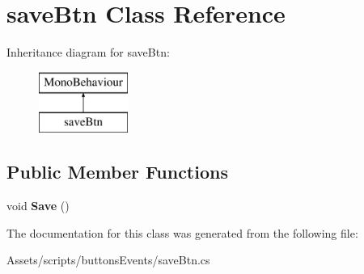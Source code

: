 \hypertarget{classsave_btn}{}\section{save\+Btn Class Reference}
\label{classsave_btn}
Inheritance diagram for save\+Btn\+:\begin{figure}[H]
\begin{center}
\leavevmode
\includegraphics[height=2.000000cm]{classsave_btn}
\end{center}
\end{figure}
\subsection*{Public Member Functions}
\begin{DoxyCompactItemize}
\item 
\mbox{\label{classsave_btn_a0e4102d46dfe26be5bc4d74726365989}} 
void {\bfseries Save} ()
\end{DoxyCompactItemize}


The documentation for this class was generated from the following file\+:\begin{DoxyCompactItemize}
\item 
Assets/scripts/buttons\+Events/save\+Btn.\+cs\end{DoxyCompactItemize}
